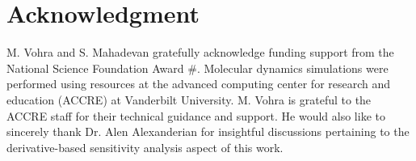\section*{Acknowledgment}
\label{sec:ack}

M. Vohra and S. Mahadevan gratefully acknowledge funding support from the
National Science Foundation Award $\#$. Molecular
dynamics simulations were performed using resources at the advanced computing
center for research and education (ACCRE) at Vanderbilt University. 
M. Vohra is grateful to the ACCRE staff for their technical guidance
and support. He would also like to sincerely thank Dr. Alen Alexanderian for
insightful discussions pertaining to the derivative-based sensitivity analysis
aspect of this work.  


